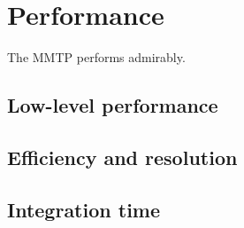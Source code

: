 \section{Performance}
\label{sec:perf}

The MMTP performs admirably.

\subsection{Low-level performance}
\label{sec:perf-simple}

\subsection{Efficiency and resolution}
\label{sec:perf-eff}

\subsection{Integration time}
\label{sec:perf-integ}

